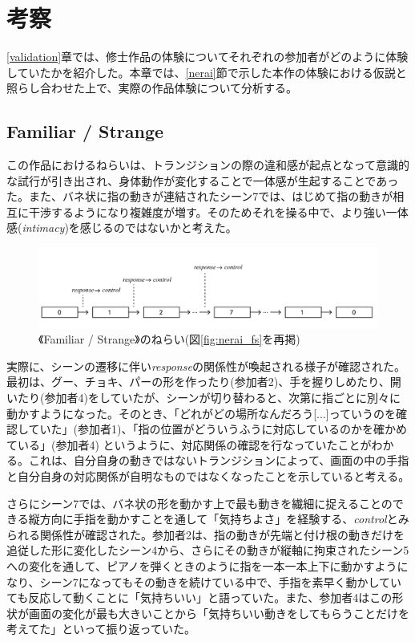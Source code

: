 \chapter{考察}
\label{考察}
\ref{validation}章では、修士作品の体験についてそれぞれの参加者がどのように体験していたかを紹介した。本章では、\ref{nerai}節で示した本作の体験における仮説と照らし合わせた上で、実際の作品体験について分析する。

\section{Familiar / Strange}
この作品におけるねらいは、トランジションの際の違和感が起点となって意識的な試行が引き出され、身体動作が変化することで一体感が生起することであった。また、バネ状に指の動きが連結されたシーン7では、はじめて指の動きが相互に干渉するようになり複雑度が増す。そのためそれを操る中で、より強い一体感(\textit{intimacy})を感じるのではないかと考えた。

\begin{figure}[H]
  \centering
  \includegraphics[width=15cm]{img/nerai_fs.png}
  \caption{《Familiar / Strange》のねらい(図\ref{fig:nerai_fs}を再掲)}
  \label{fig:nerai_fs_in_discussion}
\end{figure}

実際に、シーンの遷移に伴い\textit{response}の関係性が喚起される様子が確認された。
最初は、グー、チョキ、パーの形を作ったり(参加者2)、手を握りしめたり、開いたり(参加者4)をしていたが、シーンが切り替わると、次第に指ごとに別々に動かすようになった。そのとき、「どれがどの場所なんだろう[...]っていうのを確認していた」(参加者1)、「指の位置がどういうふうに対応しているのかを確かめている」(参加者4)
というように、対応関係の確認を行なっていたことがわかる。これは、自分自身の動きではないトランジションによって、画面の中の手指と自分自身の対応関係が自明なものではなくなったことを示していると考える。

さらにシーン7では、バネ状の形を動かす上で最も動きを繊細に捉えることのできる縦方向に手指を動かすことを通して「気持ちよさ」を経験する、\textit{control}とみられる関係性が確認された。参加者2は、指の動きが先端と付け根の動きだけを追従した形に変化したシーン4から、さらにその動きが縦軸に拘束されたシーン5への変化を通して、ピアノを弾くときのように指を一本一本上下に動かすようになり、シーン7になってもその動きを続けている中で、手指を素早く動かしていても反応して動くことに「気持ちいい」と語っていた。また、参加者4はこの形状が画面の変化が最も大きいことから「気持ちいい動きをしてもらうことだけを考えてた」といって振り返っていた。

